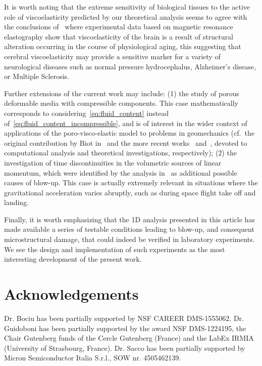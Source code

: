 \documentclass[12pt,a4paper]{amsart}
\theoremstyle{definition}
\begin{document}
It is worth noting that
the extreme sensitivity of biological tissues to the active role of viscoelasticity
predicted by our theoretical analysis seems to agree with the conclusions of~\cite{Sack2009}
where experimental data based on magnetic resonance elastography show that viscoelasticity of
the brain is a result of structural alteration occurring in the course of physiological aging,
this suggesting that cerebral viscoelasticity may provide a sensitive marker
for a variety of neurological diseases such as normal pressure hydrocephalus,
Alzheimer's disease, or Multiple Sclerosis.

Further extensions of the current work may include:
(1) the study of porous deformable media with compressible components. This case mathematically 
corresponds to considering~\eqref{eq:fluid_content} instead of~\eqref{eq:fluid_content_incompressible}, 
and is of interest 
in the wider context of applications of the poro-visco-elastic model to problems in geomechanics
(cf.~the original contribution by Biot in~\cite{biot} and the more recent 
works~\cite{phillips,phillips2,phillips3} and~\cite{Barucq_1,Barucq_2}, 
devoted to computational analysis and theoretical investigations, respectively); (2)
the investigation of time discontinuities in the volumetric sources of linear momentum, which were identified by the analysis in~\cite{ARMA} as additional possible causes of blow-up. This case is actually extremely relevant in situations where the gravitational acceleration varies abruptly, such as during space flight take off and landing.

Finally, it is worth emphasizing that the 1D analysis presented in this article has made available a series of testable conditions leading to blow-up, and consequent microstructural damage, that could indeed be verified in laboratory experiments. We see the design and implementation of such experiments as the most interesting development of the present work.

\section*{Acknowledgements}
Dr. Bociu has been partially supported by NSF CAREER DMS-1555062. Dr. Guidoboni has been partially supported by the award NSF DMS-1224195, the Chair Gutenberg funds of the
Cercle Gutenberg (France) and the LabEx IRMIA (University of Strasbourg, France).
Dr. Sacco has been partially supported by Micron Semiconductor Italia S.r.l., SOW nr. 4505462139.




\end{document}
